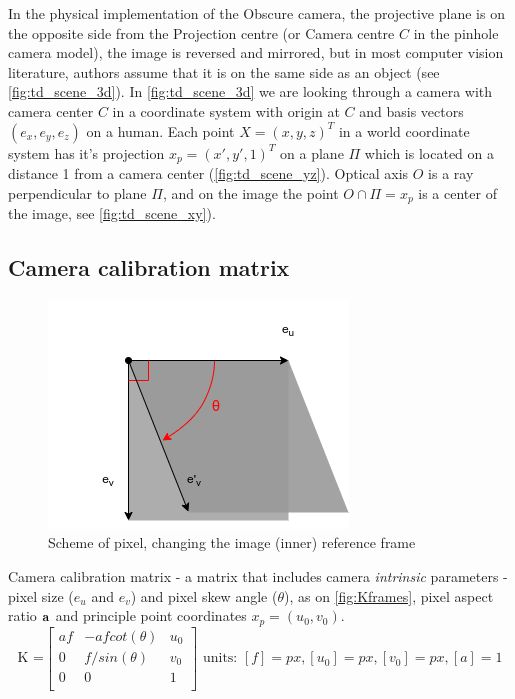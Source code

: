 In the physical implementation of the Obscure camera, the projective plane is on the opposite side from the Projection centre (or Camera centre $C$ in the pinhole camera model), the image is reversed and mirrored, but in most computer vision literature, authors assume that it is on the same side as an object (see \autoref{fig:td_scene_3d}).
In \autoref{fig:td_scene_3d} we are looking through a camera with camera center $C$ in a coordinate system with origin at $C$ and basis vectors $(e_x, e_y, e_z)$ on a human. 
Each point $X = (x, y, z)^T$ in a world coordinate system has it's projection $x_p = (x', y', 1)^T$ on a plane $\Pi$ which is located on a distance 1 from a camera center (\autoref{fig:td_scene_yz}). 
Optical axis $O$ is a ray perpendicular to plane $\Pi$, and on the image the point $ O \cap \Pi = x_p$ is a center of the image, see \autoref{fig:td_scene_xy}).

\subsection{Camera calibration matrix}
\begin{figure}[h]
    \centering
    \includegraphics[width=.6\textwidth]{graphics/pixel.png}
    \caption{Scheme of pixel, changing the image (inner) reference frame}
    \label{fig:Kframes}
\end{figure}
Camera calibration matrix - a matrix that includes camera \textit{intrinsic} parameters - pixel size ($e_u$ and $e_v$) and pixel skew angle ($\theta$), as on \autoref{fig:Kframes}, pixel aspect ratio $\bf{a}$ and principle point coordinates $x_p = (u_0, v_0)$.
\begin{equation}
    \textrm{K =}\begin{bmatrix}
        af & -a f cot(\theta) & u_0 \\
        0 & f / sin(\theta) & v_0 \\
        0 & 0 & 1 \\
    \end{bmatrix} 
    \textrm{ units: } [f]=px, [u_0]=px, [v_0]=px, [a]=1
\end{equation}


